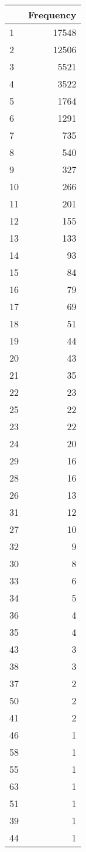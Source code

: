 \begin{tabular}{lr}
\toprule
{} &  Frequency \\
\midrule
1  &      17548 \\
2  &      12506 \\
3  &       5521 \\
4  &       3522 \\
5  &       1764 \\
6  &       1291 \\
7  &        735 \\
8  &        540 \\
9  &        327 \\
10 &        266 \\
11 &        201 \\
12 &        155 \\
13 &        133 \\
14 &         93 \\
15 &         84 \\
16 &         79 \\
17 &         69 \\
18 &         51 \\
19 &         44 \\
20 &         43 \\
21 &         35 \\
22 &         23 \\
25 &         22 \\
23 &         22 \\
24 &         20 \\
29 &         16 \\
28 &         16 \\
26 &         13 \\
31 &         12 \\
27 &         10 \\
32 &          9 \\
30 &          8 \\
33 &          6 \\
34 &          5 \\
36 &          4 \\
35 &          4 \\
43 &          3 \\
38 &          3 \\
37 &          2 \\
50 &          2 \\
41 &          2 \\
46 &          1 \\
58 &          1 \\
55 &          1 \\
63 &          1 \\
51 &          1 \\
39 &          1 \\
44 &          1 \\
\bottomrule
\end{tabular}
